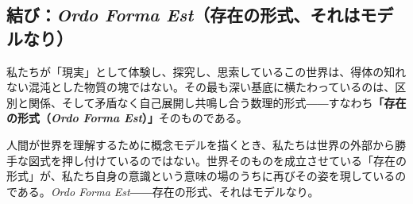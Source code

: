\documentclass[11pt,a4paper]{ltjsarticle}
\theoremstyle{definition}
\theoremstyle{plain}
\begin{document}
\subsection{結び：\textit{Ordo Forma Est}（存在の形式、それはモデルなり）}
私たちが「現実」として体験し、探究し、思索しているこの世界は、得体の知れない混沌とした物質の塊ではない。その最も深い基底に横たわっているのは、区別と関係、そして矛盾なく自己展開し共鳴し合う数理的形式――すなわち\textbf{「存在の形式（\textit{Ordo Forma Est}）」}そのものである。

人間が世界を理解するために概念モデルを描くとき、私たちは世界の外部から勝手な図式を押し付けているのではない。世界そのものを成立させている「存在の形式」が、私たち自身の意識という意味の場のうちに再びその姿を現しているのである。\textit{Ordo Forma Est}――存在の形式、それはモデルなり。
\end{document}
